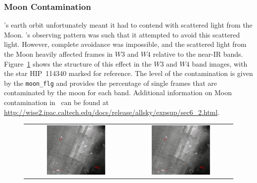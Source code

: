     
        \subsubsection{Moon Contamination}
        
        \WS's earth orbit unfortunately meant it had to contend with scattered light from the Moon. \WS's observing pattern was such that it attempted to avoid this scattered light. However, complete avoidance was impossible, and the scattered light from the Moon heavily affected frames in $W3$ and $W4$ relative to the near-IR bands. Figure~\ref{fig:moonflag_contamination} shows the structure of this effect in the $W3$ and $W4$ band images, with the star HIP~114340 marked for reference. The level of the contamination is given by the \verb|moon_flg| and provides the percentage of single frames that are contaminated by the moon for each band. Additional information on Moon contamination in \WS\ can be found at \url{http://wise2.ipac.caltech.edu/docs/release/allsky/expsup/sec6_2.html}.
        
        \begin{figure}[!h]
        \begin{tabular}{cc}
        \includegraphics[width=0.6\textwidth]{Ch2/moonflg_HIP114340_W3_88}&
        \includegraphics[width=0.6\textwidth]{Ch2/moonflg_HIP114340_W3_88}
        \end{tabular}
        \caption[]{}
        \label{fig:moonflag_contamination}
        \end{figure}
    
